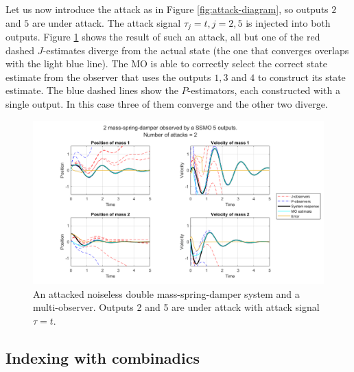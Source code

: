 Let us now introduce the attack as in Figure \ref{fig:attack-diagram}, so outputs $2$ and $5$ are under attack. The attack signal $\tau_j=t,j=2,5$ is injected into both outputs. Figure \ref{fig:attacked-system-plot} shows the result of such an attack, all but one of the red dashed $J$-estimates diverge from the actual state (the one that converges overlaps with the light blue line). The MO is able to correctly select the correct state estimate from the observer that uses the outputs $1,3$ and $4$ to construct its state estimate. The blue dashed lines show the $P$-estimators, each constructed with a single output. In this case three of them converge and the other two diverge. 
\newpage
\begin{figure}[H]
    \centering
    \includegraphics[width=\linewidth]{report/Figures/symplot_5o2a}
    \caption{An attacked noiseless double mass-spring-damper system and a multi-observer. Outputs 2 and 5 are under attack with attack signal $\tau=t$.} 
    \label{fig:attacked-system-plot}
\end{figure}

\subsection{Indexing with combinadics}